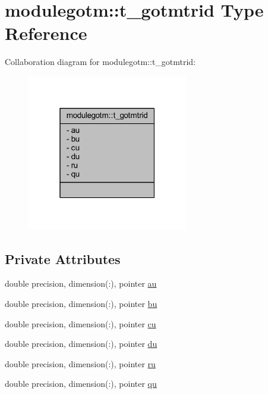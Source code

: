 \hypertarget{structmodulegotm_1_1t__gotmtrid}{}\section{modulegotm\+:\+:t\+\_\+gotmtrid Type Reference}
\label{structmodulegotm_1_1t__gotmtrid}


Collaboration diagram for modulegotm\+:\+:t\+\_\+gotmtrid\+:\nopagebreak
\begin{figure}[H]
\begin{center}
\leavevmode
\includegraphics[width=199pt]{structmodulegotm_1_1t__gotmtrid__coll__graph}
\end{center}
\end{figure}
\subsection*{Private Attributes}
\begin{DoxyCompactItemize}
\item 
double precision, dimension(\+:), pointer \mbox{\hyperlink{structmodulegotm_1_1t__gotmtrid_ad74b8bda4aeed203f1d44fd5d16530ab}{au}}
\item 
double precision, dimension(\+:), pointer \mbox{\hyperlink{structmodulegotm_1_1t__gotmtrid_a6bbd35672ea4be2e3440ef6a1c62f512}{bu}}
\item 
double precision, dimension(\+:), pointer \mbox{\hyperlink{structmodulegotm_1_1t__gotmtrid_a993c9d12d1cf97593cabf7a72a40cbc9}{cu}}
\item 
double precision, dimension(\+:), pointer \mbox{\hyperlink{structmodulegotm_1_1t__gotmtrid_a4932cf94795a6fbad6a1227b6a22aa6a}{du}}
\item 
double precision, dimension(\+:), pointer \mbox{\hyperlink{structmodulegotm_1_1t__gotmtrid_ada03278c23e54a9d91684e4dd43a8077}{ru}}
\item 
double precision, dimension(\+:), pointer \mbox{\hyperlink{structmodulegotm_1_1t__gotmtrid_a77dfb895a7480285da2867c50addfef0}{qu}}
\end{DoxyCompactItemize}



